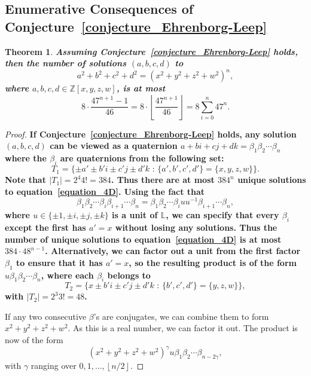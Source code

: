 \documentclass[12pt,table]{article}
\newtheorem{theorem}{Theorem}
\numberwithin{equation}{section}
\newcommand{\myfrac}[2]{#1 / #2}
\newcommand{\Zzz}{\mathbb Z}
\newcommand{\Lll}{\mathbb L}
\begin{document}
\begin{landscape}
{{\section{Enumerative Consequences of Conjecture~\ref{conjecture_Ehrenborg-Leep}} 

\begin{theorem}
\label{theorem_counting_4D}
\bf
Assuming Conjecture~\ref{conjecture_Ehrenborg-Leep} holds,
then the number of solutions $ (a, b, c, d) $ to
\begin{equation}
\label{equation_4D}
a^2 + b^2 + c^2 + d^2 = (x^2 + y^2 + z^2 + w^2)^n,
\end{equation}
where $ a, b, c, d \in \Zzz[x,y,z,w]$,
is at most
\[
8 \cdot \frac{47^{n+1} - 1}{46}
=  8 \cdot \left\lfloor \frac{ 47^{n+1} }{46} \right\rfloor
=  8 \sum_{i = 0}^n{47^n}.
\]
\end{theorem}
\begin{proof}
\bf
If Conjecture~\ref{conjecture_Ehrenborg-Leep} holds, any
solution
$ (a, b, c, d) $ can be viewed as a quaternion
$ a + bi + cj + dk = \beta_1 \beta_2 \dotsm \beta_n $
where the $\beta_i$ are quaternions from the following set:
\[
T_1 = \{ \pm a' \pm b'i \pm c'j \pm d'k
\text{ : } \{ a', b', c', d' \} = \{ x, y, z, w \} \}. 
\]
Note that $ | T_1 | = 2^4 4! = 384 $.
Thus there are at most $ 384^n $ unique solutions to equation~\eqref{equation_4D}.
Using the fact that
\[
\beta_1 \beta_2 \dotsm \beta_i \beta_{i+1} \dotsm \beta_n
=
\beta_1 \beta_2 \dotsm \beta_i u u^{-1} \beta_{i+1} \dotsm \beta_n,
\]
where $ u \in \{ \pm 1 , \pm i, \pm j, \pm k \} $ is a unit of $\Lll$,
we can specify
that every $\beta_i$ except the first has $ a' = x $ without
losing any solutions. Thus the number of unique solutions
to equation~\eqref{equation_4D} is at most
$ 384 \cdot 48^{n-1} $. Alternatively, we can factor out a unit
from the first factor $\beta_1$ to ensure that it has $ a' = x $, so the
resulting product is of the form $ u \beta_1 \beta_2 \dotsm \beta_n $,
where each $ \beta_i $ belongs to
\[
T_2 = \{ x \pm b'i \pm c'j \pm d'k
\text{ : } \{ b', c', d' \} = \{ y, z, w \} \},
\]
with $ | T_2 | = 2^3 3! = 48 $.

If any two consecutive $ \beta $'s are conjugates, we can combine them
to form $ x^2 + y^2 + z^2 + w^2 $. As this is a real number, we can
factor it out. The product is now of the form
\[
(x^2 + y^2 + z^2 + w^2)^\gamma u \beta_1 \beta_2 \dotsm \beta_{n-2\gamma},
\]
with $ \gamma $ ranging over $ 0, 1, \dotsc, \left\lfloor \myfrac{n}{2} \right\rfloor $.


\end{proof}}}
\end{landscape}
\end{document}
